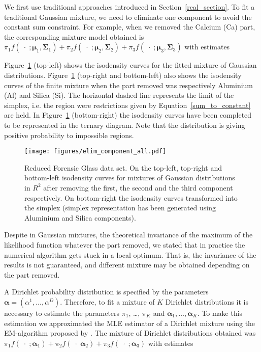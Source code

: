 \documentclass[12pt, a4paper]{article}
\newcommand{\m}[1]{\boldsymbol{#1}}
\begin{document}
We first use traditional approaches introduced in Section~\ref{real_section}. To fit a traditional Gaussian mixture, we need to eliminate one component to avoid the constant sum constraint. For example, when we removed the Calcium (Ca) part, the corresponding mixture model obtained is
$
\pi_1 f(\;\cdot\; ; \m\mu_1, \m\Sigma_1) + \pi_2 f(\;\cdot\; ; \m\mu_2, \m\Sigma_2) + \pi_3 f(\;\cdot\; ; \m\mu_3, \m\Sigma_3)
$
with estimates

{\small  }


Figure~\ref{fig05component_elimination} (top-left) shows the isodensity curves for the fitted mixture of Gaussian distributions. Figure~\ref{fig05component_elimination} (top-right and bottom-left) also shows the isodensity curves of the finite mixture when the part removed was respectively Aluminium (Al) and Silica (Si). The horizontal dashed line represents the limit of the simplex, i.e. the region were restrictions given by Equation~\ref{sum_to_constant} are held. In Figure~\ref{fig05component_elimination} (bottom-right) the isodensity curves have been completed to be represented in the ternary diagram. Note that the distribution is giving positive probability to impossible regions. 

\begin{figure}[htbp]
\texttt{[image: figures/elim\_component\_all.pdf]}
\caption{Reduced Forensic Glass data set. On the top-left, top-right and bottom-left isodensity curves for mixtures of Gaussian distributions in $R^{2}$ after removing the first, the second and the third component respectively. On bottom-right the isodensity curves transformed into the simplex (simplex representation has been generated using Aluminium and Silica components).}
\label{fig05component_elimination}
\end{figure}

Despite in Gaussian mixtures, the theoretical invariance of the maximum of the likelihood function whatever the part removed, we stated that in practice the numerical algorithm gets stuck in a local optimum. That is, the invariance of the results is not guaranteed, and different mixture may be obtained depending on the part removed. 

A Dirichlet probability distribution is specified by the parameters $\m\alpha=\left( \alpha^1, \dots ,\alpha^D \right)$. Therefore, to fit a mixture of $K$ Dirichlet distributions it is necessary to estimate the parameters $\pi_1$, \dots, $\pi_K$ and $\m\alpha_1, \dots, \m\alpha_K$. To make this estimation we approximated the MLE estimator of a Dirichlet mixture using the EM-algorithm proposed by \cite{celeux1992classification}. The mixture of Dirichlet distributions obtained was $
\pi_1 f(\;\cdot\; ; \m\alpha_1) + \pi_2 f(\;\cdot\; \m\alpha_2) + \pi_3 f(\;\cdot\; ; \m\alpha_3)
$
 with estimates
{\small  }
\end{document}
